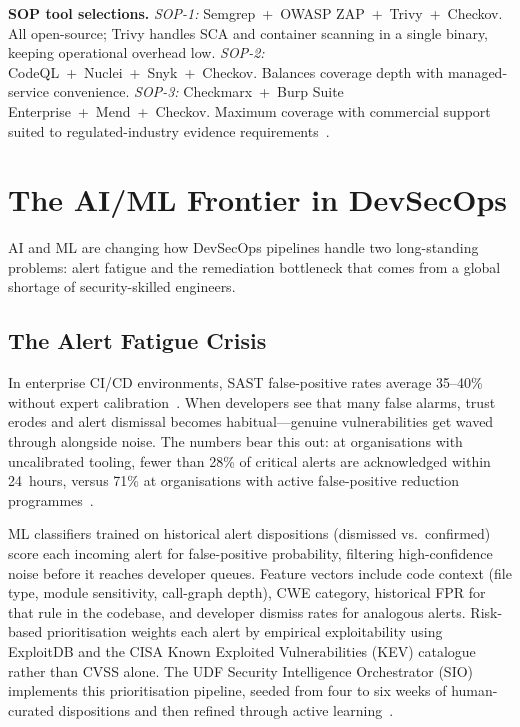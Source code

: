 \documentclass[letterpaper, 10pt, conference]{ieeeconf}
\begin{document}
\textbf{SOP tool selections.}
\textit{SOP-1:} Semgrep~+~OWASP ZAP~+~Trivy~+~Checkov. All
open-source; Trivy handles SCA and container scanning in a single
binary, keeping operational overhead low.
\textit{SOP-2:} CodeQL~+~Nuclei~+~Snyk~+~Checkov. Balances coverage
depth with managed-service convenience.
\textit{SOP-3:} Checkmarx~+~Burp Suite Enterprise~+~Mend~+~Checkov.
Maximum coverage with commercial support suited to regulated-industry
evidence requirements~\cite{solanke2022}.

\section{The AI/ML Frontier in DevSecOps}

AI and ML are changing how DevSecOps pipelines handle two long-standing
problems: alert fatigue and the remediation bottleneck that comes from
a global shortage of security-skilled engineers.

\subsection{The Alert Fatigue Crisis}

In enterprise CI/CD environments, SAST false-positive rates average
35--40\% without expert calibration~\cite{thota2024}. When developers
see that many false alarms, trust erodes and alert dismissal becomes
habitual---genuine vulnerabilities get waved through alongside noise.
The numbers bear this out: at organisations with uncalibrated tooling,
fewer than 28\% of critical alerts are acknowledged within 24~hours,
versus 71\% at organisations with active false-positive reduction
programmes~\cite{thota2024}.

ML classifiers trained on historical alert dispositions (dismissed
vs.\ confirmed) score each incoming alert for false-positive
probability, filtering high-confidence noise before it reaches developer
queues. Feature vectors include code context (file type, module
sensitivity, call-graph depth), CWE category, historical FPR for that
rule in the codebase, and developer dismiss rates for analogous alerts.
Risk-based prioritisation weights each alert by empirical exploitability
using ExploitDB and the CISA Known Exploited Vulnerabilities (KEV)
catalogue rather than CVSS alone. The UDF Security Intelligence
Orchestrator (SIO) implements this prioritisation pipeline, seeded from
four to six weeks of human-curated dispositions and then refined through
active learning~\cite{singh2020}.
\end{document}

